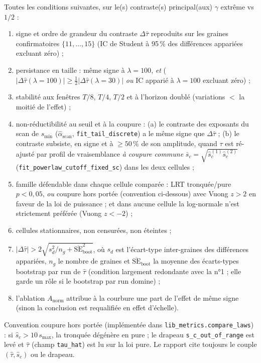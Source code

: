 \documentclass[11pt,a4paper]{article}
\newcommand{\code}[1]{\texttt{#1}}
\begin{document}
Toutes les conditions suivantes, sur le(s) contraste(s) principal(aux)
$\gamma$ extrême vs $1/2$ :
\begin{enumerate}
\item signe et ordre de grandeur du contraste $\Delta\hat\tau$ reproduits
sur les graines confirmatoires $\{11,\dots,15\}$ (IC de Student à 95\,\%
des différences appariées excluant zéro) ;
\item persistance en taille : même signe à $\lambda=100$, \emph{et}
($|\Delta\hat\tau(\lambda{=}100)|\ge\tfrac12|\Delta\hat\tau(\lambda{=}30)|$
\emph{ou} IC apparié à $\lambda=100$ excluant zéro) ;
\item stabilité aux fenêtres $T/8$, $T/4$, $T/2$ et à l'horizon doublé
(variations $<$ la moitié de l'effet) ;
\item non-réductibilité au seuil et à la coupure : (a) le contraste des
exposants du scan de $s_{\min}$ ($\hat\alpha_{\mathrm{scan}}$,
\code{fit\_tail\_discrete}) a le même signe que $\Delta\hat\tau$ ;
(b) le contraste subsiste, en signe et à $\ge50\,\%$ de son amplitude,
quand $\tau$ est ré-ajusté par profil de vraisemblance \emph{à coupure
commune} $\bar s_c=\sqrt{\hat s_c^{(1)}\hat s_c^{(2)}}$
(\code{fit\_powerlaw\_cutoff\_fixed\_sc}) dans les deux cellules ;
\item famille défendable dans chaque cellule comparée : LRT tronquée/pure
$p<0{,}05$, \emph{ou} coupure hors portée (convention ci-dessous) avec
Vuong $z>2$ en faveur de la loi de puissance ; et dans aucune cellule la
log-normale n'est strictement préférée (Vuong $z<-2$) ;
\item cellules stationnaires, non censurées, non éteintes ;
\item $|\Delta\hat\tau|>2\sqrt{s_d^2/n_g+\overline{\mathrm{SE}}^2_{\mathrm{boot}}}$,
où $s_d$ est l'écart-type inter-graines des différences appariées, $n_g$
le nombre de graines et $\overline{\mathrm{SE}}_{\mathrm{boot}}$ la
moyenne des écarts-types bootstrap par run de $\hat\tau$ (condition
largement redondante avec la n°1 ; elle garde un rôle si le bootstrap
par run domine) ;
\item l'ablation $A_{\mathrm{norm}}$ attribue à la courbure une part de
l'effet de même signe (sinon la conclusion est requalifiée en effet
d'échelle).
\end{enumerate}

Convention \og coupure hors portée \fg{} (implémentée dans
\code{lib\_metrics.compare\_laws}) : si $\hat s_c>10\,s_{\max}$, la
tronquée dégénère en pure ; le drapeau \code{s\_c\_out\_of\_range} est levé
et $\hat\tau$ (champ \code{tau\_hat}) est lu sur la loi pure. Le rapport
cite toujours le couple $(\hat\tau,\hat s_c)$ ou le drapeau.
\end{document}
